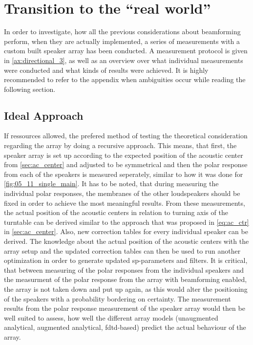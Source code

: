 \section{Transition to the ``real world'' }\label{sec:rw_transition}
In order to investigate, how all the previous considerations about beamforming perform, when they are actually implemented, a series of measurements with a custom built speaker array has been conducted. A measurement protocol is given in \autoref{ax:directional_3}, as well as an overview over what individual measurements were conducted and what kinds of results were achieved. It is highly recommended to refer to the appendix when ambiguities occur while reading the following section.\\


\subsection{Ideal Approach}\label{ssec:ideal_approach}
If ressources allowed, the prefered method of testing the theoretical consideration regarding the array by doing a recursive approach. This means, that first, the speaker array is set up according to the expected position of the acoustic center from \autoref{sec:ac_center} and adjusted to be symmetrical and then the polar response from each of the speakers is measured seperately, similar to how it was done for \autoref{fig:05_11_single_main}. It has to be noted, that during measuring the individual polar responses, the membranes of the other loudspeakers should be fixed in order to achieve the most meaningful results. From these measurements, the actual position of the acoustic centers in relation to turning axis of the turntable can be derived similar to the approach that was proposed in \autoref{eq:ac_ctr} in \autoref{sec:ac_center}. Also, new correction tables for every individual speaker can be derived. The knowledge about the actual position of the acoustic centers with the array setup and the updated correction tables can then be used to run another optimization in order to generate updated \gls{sp}-parameters and filters. It is critical, that between measuring of the polar responses from the individual speakers and the measurment of the polar response from the array with beamforming enabled, the array is not taken down and put up again, as this would alter the positioning of the speakers with a probability bordering on certainty.
The measurement results from the polar response measurement of the speaker array would then be well suited to assess, how well the different array models (unaugmented analytical, augmented analytical, \gls{fdtd}-based) predict the actual behaviour of the array.

